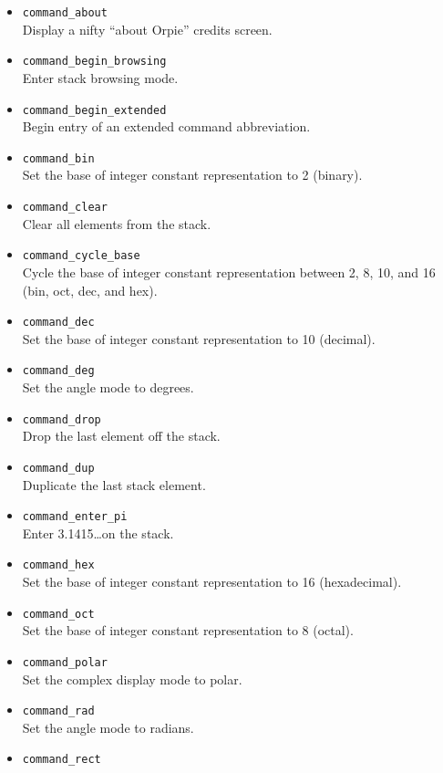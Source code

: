 \documentclass[11pt,notitlepage]{article}
\begin{document}
\begin{itemize}
   \item {\tt command\_about} \\
      Display a nifty ``about Orpie'' credits screen.
   \item {\tt command\_begin\_browsing} \\
      Enter stack browsing mode.
   \item {\tt command\_begin\_extended} \\
      Begin entry of an extended command abbreviation.
   \item {\tt command\_bin} \\
      Set the base of integer constant representation to 2 (binary).
   \item {\tt command\_clear} \\
      Clear all elements from the stack.
   \item {\tt command\_cycle\_base} \\
      Cycle the base of integer constant representation between 2, 8,
      10, and 16 (bin, oct, dec, and hex).
   \item {\tt command\_dec} \\
      Set the base of integer constant representation to 10 (decimal).
   \item {\tt command\_deg} \\
      Set the angle mode to degrees.
   \item {\tt command\_drop} \\
      Drop the last element off the stack.
   \item {\tt command\_dup} \\
      Duplicate the last stack element.
   \item {\tt command\_enter\_pi} \\
      Enter 3.1415\dots on the stack.
   \item {\tt command\_hex} \\
      Set the base of integer constant representation to 16 (hexadecimal).
   \item {\tt command\_oct} \\
      Set the base of integer constant representation to 8 (octal).
   \item {\tt command\_polar} \\
      Set the complex display mode to polar.
   \item {\tt command\_rad} \\
      Set the angle mode to radians.
   \item {\tt command\_rect} \\

\end{itemize}
\end{document}
